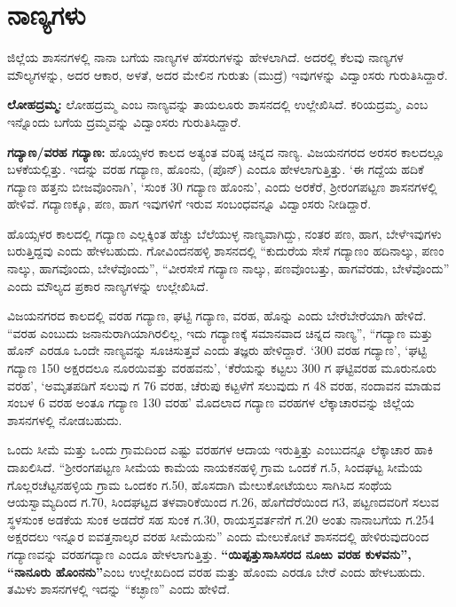 \section{ನಾಣ್ಯಗಳು}

ಜಿಲ್ಲೆಯ ಶಾಸನಗಳಲ್ಲಿ ನಾನಾ ಬಗೆಯ ನಾಣ್ಯಗಳ ಹೆಸರುಗಳನ್ನು ಹೇಳಲಾಗಿದೆ. ಅದರಲ್ಲಿ ಕೆಲವು ನಾಣ್ಯಗಳ ಮೌಲ್ಯಗಳನ್ನು, ಅದರ ಆಕಾರ, ಅಳತೆ, ಅದರ ಮೇಲಿನ ಗುರುತು (ಮುದ್ರೆ) ಇವುಗಳನ್ನು ವಿದ್ವಾಂಸರು ಗುರುತಿಸಿದ್ದಾರೆ.

\textbf{ಲೋಹದ್ರಮ್ಮ:} ಲೋಹದ್ರಮ್ಮ ಎಂಬ ನಾಣ್ಯವನ್ನು ತಾಯಲೂರು ಶಾಸನದಲ್ಲಿ ಉಲ್ಲೇಖಿಸಿದೆ. ಕರಿಯದ್ರಮ್ಮ, ಎಂಬ ಇನ್ನೊಂದು ಬಗೆಯ ದ್ರಮ್ಮವನ್ನು ವಿದ್ವಾಂಸರು ಗುರುತಿಸಿದ್ದಾರೆ.

\textbf{ಗದ್ಯಾಣ/ವರಹ ಗದ್ಯಾಣ: } ಹೊಯ್ಸಳರ ಕಾಲದ ಅತ್ಯಂತ ವರಿಷ್ಠ ಚಿನ್ನದ ನಾಣ್ಯ. ವಿಜಯನಗರದ ಅರಸರ ಕಾಲದಲ್ಲೂ ಬಳಕೆಯಲ್ಲಿತ್ತು. ಇದನ್ನು ವರಹ ಗದ್ಯಾಣ, ಹೊಂನು, (ಪೊನ್​) ಎಂದೂ ಹೇಳಲಾಗುತ್ತಿತ್ತು. ‘ಈ ಗದ್ದೆಯ ಹದಿಕೆ ಗದ್ಯಾಣ ಹತ್ತನು ಬೀಜವೊಂನಾಗಿ’, ‘ಸುಂಕ 30 ಗದ್ಯಾಣ ಹೊಂನು’, ಎಂದು ಅರಕೆರೆ, ಶ‍್ರೀರಂಗಪಟ್ಟಣ ಶಾಸನಗಳಲ್ಲಿ ಹೇಳಿವೆ. ಗದ್ಯಾಣಕ್ಕೂ, ಪಣ, ಹಾಗ ಇವುಗಳಿಗೆ ಇರುವ ಸಂಬಂಧವನ್ನೂ ವಿದ್ವಾಂಸರು ನೀಡಿದ್ದಾರೆ.

ಹೊಯ್ಸಳರ ಕಾಲದಲ್ಲಿ ಗದ್ಯಾಣ ಎಲ್ಲಕ್ಕಿಂತ ಹೆಚ್ಚು ಬೆಲೆಯುಳ್ಳ ನಾಣ್ಯವಾಗಿದ್ದು, ನಂತರ ಪಣ, ಹಾಗ, ಬೇಳೆ\break ಇವುಗಳು ಬರುತ್ತಿದ್ದವು ಎಂದು ಹೇಳಬಹುದು. ಗೋವಿಂದನಹಳ್ಳಿ ಶಾಸನದಲ್ಲಿ “ಕುದುರೆಯ ಸೇಸೆ ಗದ್ಯಾಣಂ ಹದಿನಾಲ್ಕು, ಪಣಂ ನಾಲ್ಕು, ಹಾಗವೊಂದು, ಬೇಳೆವೊಂದು”, “ವೀರಸೇಸೆ ಗದ್ಯಾಣ ನಾಲ್ಕು, ಪಣವೊಂಬತ್ತು, ಹಾಗವೆರಡು, ಬೇಳೆವೊಂದು” ಎಂದು ಮೌಲ್ಯದ ಪ್ರಕಾರ ನಾಣ್ಯಗಳನ್ನು ಉಲ್ಲೇಖಿಸಿದೆ.

ವಿಜಯನಗರದ ಕಾಲದಲ್ಲಿ ವರಹ ಗದ್ಯಾಣ, ಘಟ್ಟಿ ಗದ್ಯಾಣ, ವರಹ, ಹೊನ್ನು ಎಂದು ಬೇರೆಬೇರೆಯಾಗಿ ಹೇಳಿದೆ. “ವರಹ ಎಂಬುದು ಜನಾನುರಾಗಿಯಾಗಿರಲಿಲ್ಲ, ಇದು ಗದ್ಯಾಣಕ್ಕೆ ಸಮಾನವಾದ ಚಿನ್ನದ ನಾಣ್ಯ”, “ಗದ್ಯಾಣ ಮತ್ತು ಹೊನ್​ ಎರಡೂ ಒಂದೇ ನಾಣ್ಯವನ್ನು ಸೂಚಿಸುತ್ತವೆ ಎಂದು ತಜ್ಞರು ಹೇಳಿದ್ದಾರೆ. ‘300 ವರಹ ಗದ್ಯಾಣ’, ‘ಘಟ್ಟಿ ಗದ್ಯಾಣ 150 ಅಕ್ಷರದಲೂ ನೂರಯಿವತ್ತು ವರಹವನು’, ‘ಕೆರೆಯನ್ನು ಕಟ್ಟಲು 300 ಗ ಘಟ್ಟಿವರಹ ಮೂರುನೂರು ವರಹ’, ‘ಅಮೃತಪಡಿಗೆ ಸಲುವು ಗ 76 ವರಹ, ಚೆರುಪು ಕಟ್ಟಳೆಗೆ ಸಲುವುದು ಗ 48 ವರಹ, ನಂದಾವನ ಮಾಡುವ ಸಂಬಳ 6 ವರಹ ಅಂತೂ ಗದ್ಯಾಣ 130 ವರಹ’ ಮೊದಲಾದ ಗದ್ಯಾಣ ವರಹಗಳ ಲೆಕ್ಕಾಚಾರವನ್ನು ಜಿಲ್ಲೆಯ ಶಾಸನಗಳಲ್ಲಿ ನೋಡಬಹುದು.

ಒಂದು ಸೀಮೆ ಮತ್ತು ಒಂದು ಗ್ರಾಮದಿಂದ ಎಷ್ಟು ವರಹಗಳ ಆದಾಯ ಇರುತ್ತಿತ್ತು ಎಂಬುದನ್ನೂ ಲೆಕ್ಕಾಚಾರ ಹಾಕಿ ದಾಖಲಿಸಿದೆ. “ಶ‍್ರೀರಂಗಪಟ್ಟಣ ಸೀಮೆಯ ಕಾಮೆಯ ನಾಯಕನಹಳ್ಳಿ ಗ್ರಾಮ ಒಂದಕೆ ಗ.5, ಸಿಂದಘಟ್ಟ ಸೀಮೆಯ ಗೊಲ್ಲರಚೆಟ್ಟನಹಳ್ಳಿಯ ಗ್ರಾಮ ಒಂದಕಂ ಗ.50, ಹೊಸದಾಗಿ ಮೇಲುಕೋಟೆಯಲು ಸಾಗಿಸಿದ ಸಂಥೆಯ ಆಯಸ್ವಾಮ್ಯದಿಂದ ಗ.70, ಸಿಂದಘಟ್ಟದ ತಳವಾರಿಕೆಯಿಂದ ಗ.26, ಹೊಗೆದೆರೆಯಿಂದ ಗ3, ಪಟ್ಟಣದವರಿಗೆ ಸಲುವ ಸ್ಥಳಸುಂಕ ಅಡಕೆಯ ಸುಂಕ ಅಡದೆರೆ ಸಹ ಸುಂಕ ಗ.30, ರಾಯಸ್ತವರ್ತನೆಗೆ ಗ.20 ಅಂತು ನಾನಾಬಗೆಯ ಗ.254 ಅಕ್ಷರದಲು ಇನ್ನೂರ ಐವತ್ತನಾಲ್ಕರ ವರಹ ಸೀಮೆಯನು” ಎಂದು ಮೇಲುಕೋಟೆ ಶಾಸನದಲ್ಲಿ ಹೇಳಿರುವುದರಿಂದ ಗದ್ಯಾಣವನ್ನು ವರಹಗದ್ಯಾಣ ಎಂದೂ ಹೇಳಲಾಗುತ್ತಿತ್ತು. \textbf{“ಯಿಪ್ಪತ್ತುಸಾಸಿಸರದ ನೂಱು ವರಹ ಕುಳವನು”, “ನಾನೂರು ಹೊಂನನು”}ಎಂಬ ಉಲ್ಲೇಖದಿಂದ ವರಹ ಮತ್ತು ಹೊಂಮ ಎರಡೂ ಬೇರೆ ಎಂದು ಹೇಳಬಹುದು. ತಮಿಳು ಶಾಸನಗಳಲ್ಲಿ ಇದನ್ನು “ಕಚ್ಛಾಣ” ಎಂದು ಹೇಳಿದೆ.

